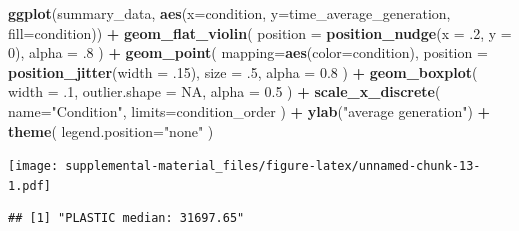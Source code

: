\documentclass[]{book}
\newenvironment{Shaded}{\begin{snugshade}}{\end{snugshade}}
\newcommand{\DataTypeTok}[1]{\textcolor[rgb]{0.13,0.29,0.53}{#1}}
\newcommand{\DecValTok}[1]{\textcolor[rgb]{0.00,0.00,0.81}{#1}}
\newcommand{\FloatTok}[1]{\textcolor[rgb]{0.00,0.00,0.81}{#1}}
\newcommand{\KeywordTok}[1]{\textcolor[rgb]{0.13,0.29,0.53}{\textbf{#1}}}
\newcommand{\NormalTok}[1]{#1}
\newcommand{\OperatorTok}[1]{\textcolor[rgb]{0.81,0.36,0.00}{\textbf{#1}}}
\newcommand{\OtherTok}[1]{\textcolor[rgb]{0.56,0.35,0.01}{#1}}
\newcommand{\StringTok}[1]{\textcolor[rgb]{0.31,0.60,0.02}{#1}}
\begin{document}
\begin{Shaded}
\begin{Highlighting}[]
\KeywordTok{ggplot}\NormalTok{(summary_data, }\KeywordTok{aes}\NormalTok{(}\DataTypeTok{x=}\NormalTok{condition, }\DataTypeTok{y=}\NormalTok{time_average_generation, }\DataTypeTok{fill=}\NormalTok{condition)) }\OperatorTok{+}
\StringTok{  }\KeywordTok{geom_flat_violin}\NormalTok{(}
    \DataTypeTok{position =} \KeywordTok{position_nudge}\NormalTok{(}\DataTypeTok{x =} \FloatTok{.2}\NormalTok{, }\DataTypeTok{y =} \DecValTok{0}\NormalTok{),}
    \DataTypeTok{alpha =} \FloatTok{.8}
\NormalTok{  ) }\OperatorTok{+}
\StringTok{  }\KeywordTok{geom_point}\NormalTok{(}
    \DataTypeTok{mapping=}\KeywordTok{aes}\NormalTok{(}\DataTypeTok{color=}\NormalTok{condition),}
    \DataTypeTok{position =} \KeywordTok{position_jitter}\NormalTok{(}\DataTypeTok{width =} \FloatTok{.15}\NormalTok{),}
    \DataTypeTok{size =} \FloatTok{.5}\NormalTok{,}
    \DataTypeTok{alpha =} \FloatTok{0.8}
\NormalTok{  ) }\OperatorTok{+}
\StringTok{  }\KeywordTok{geom_boxplot}\NormalTok{(}
    \DataTypeTok{width =} \FloatTok{.1}\NormalTok{,}
    \DataTypeTok{outlier.shape =} \OtherTok{NA}\NormalTok{,}
    \DataTypeTok{alpha =} \FloatTok{0.5}
\NormalTok{  ) }\OperatorTok{+}
\StringTok{  }\KeywordTok{scale_x_discrete}\NormalTok{(}
    \DataTypeTok{name=}\StringTok{"Condition"}\NormalTok{,}
    \DataTypeTok{limits=}\NormalTok{condition_order}
\NormalTok{  ) }\OperatorTok{+}
\StringTok{  }\KeywordTok{ylab}\NormalTok{(}\StringTok{"average generation"}\NormalTok{) }\OperatorTok{+}
\StringTok{  }\KeywordTok{theme}\NormalTok{(}
    \DataTypeTok{legend.position=}\StringTok{"none"}
\NormalTok{  )}
\end{Highlighting}
\end{Shaded}

\texttt{[image: supplemental-material\_files/figure-latex/unnamed-chunk-13-1.pdf]}

\begin{Shaded}
\end{Shaded}

\begin{verbatim}
## [1] "PLASTIC median: 31697.65"
\end{verbatim}
\end{document}
